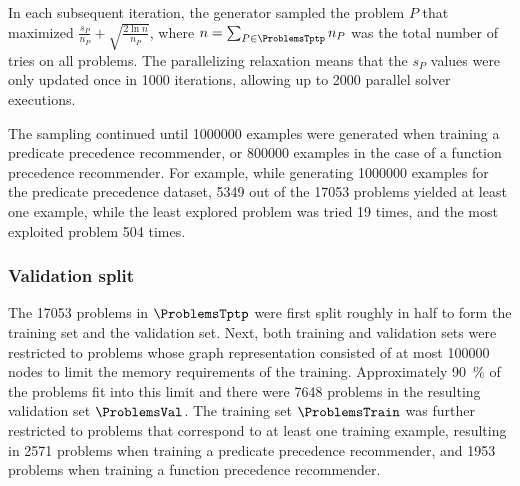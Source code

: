 In each subsequent iteration, the generator sampled the problem $P$ that maximized
$\frac{s_P}{n_P} + \sqrt{\frac{2 \ln n}{n_P}}$,
where $n = \sum_{P \in \ProblemsTptp} n_P$ was the total number of tries on all problems.
The parallelizing relaxation means that the $s_P$ values were only updated once in \num{1000} iterations,
allowing up to \num{2000} parallel solver executions.

The sampling continued until \num{1000000} examples were generated when training a predicate precedence recommender,
or \num{800000} examples in the case of a function precedence recommender.
For example, while generating \num{1000000} examples for the predicate precedence dataset,
\num{5349} out of the \num{17053} problems yielded at least one example,
while the least explored problem was tried 19 times, and the most exploited problem 504 times.

\subsubsection{Validation split}

The \num{17053} problems in $\ProblemsTptp$ were first split roughly in half to form the training set and the validation set.
Next, both training and validation sets were restricted
to problems whose graph representation consisted of at most \num{100000} nodes
to limit the memory requirements of the training.
Approximately \SI{90}{\percent} of the problems fit into this limit
and there were \num{7648} problems in the resulting validation set $\ProblemsVal$.
The training set $\ProblemsTrain$ was further restricted to problems that correspond to at least one training example,
resulting in \num{2571} problems when training a predicate precedence recommender,
and \num{1953} problems when training a function precedence recommender.

